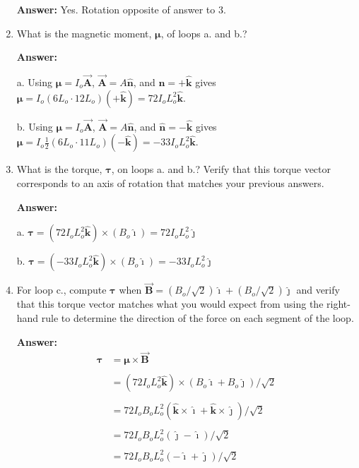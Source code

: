 \documentclass{article}
\newcommand{\ihat}[0]{\hat{\boldsymbol{\imath}}}
\newcommand{\jhat}[0]{\hat{\boldsymbol{\jmath}}}
\newcommand{\khat}[0]{\hat{\boldsymbol{k}}}
\newcommand{\bfvec}[1]{\vec{\mathbf{#1}}}
\begin{document}
\begin{enumerate}
        \ifsolutions
        {\bf Answer: } Yes. Rotation opposite of answer to 3.
        \else
        \vskip 56.25pt
        \fi
        \ifsolutions\else
        \vskip 56.25pt
        \fi

  \item What is the magnetic moment, $\boldsymbol{\mu}$, of loops a. and b.?

        \ifsolutions
        {\bf Answer:} 

        a. Using $\boldsymbol{\mu} = I_o\bfvec{A}$, $\bfvec{A} = A\hat{\mathbf{n}}$, and $\hat{\mathbf{n}} = +\khat$ gives $\boldsymbol{\mu } = I_o(6L_o\cdot 12 L_o)(+\khat) = 72I_oL_o^2\khat$.

        b.  Using $\boldsymbol{\mu} = I_o\bfvec{A}$, $\bfvec{A} = A\hat{\mathbf{n}}$, and $\hat{\mathbf{n}} = -\khat$ gives $\boldsymbol{\mu } = I_o\frac{1}{2}(6L_o\cdot 11 L_o)(-\khat) = -33I_oL_o^2\khat$.
        \else
        \vskip 56.25pt
        \fi
        \ifsolutions\else
        \vskip 56.25pt
        \fi

  \item What is the torque, $\boldsymbol{\tau}$, on loops a. and b.? Verify that this torque vector corresponds to an axis of rotation that matches your previous answers.

        \ifsolutions
        {\bf Answer: }

        a. $\boldsymbol{\tau}= (72I_oL_o^2\khat)\times (B_o\ihat)= 72I_oL_o^2\jhat$

        b. $\boldsymbol{\tau}= (-33I_oL_o^2\khat)\times (B_o\ihat)= -33I_oL_o^2\jhat$
        \else
        \vskip 56.25pt
        \fi
        \ifsolutions\else
        \vskip 56.25pt
        \fi

  \item For loop c., compute $\boldsymbol{\tau}$ when $\bfvec{B}=(B_o/\sqrt{2})\ihat + (B_o/\sqrt{2})\jhat$ and verify that this torque vector matches what you would expect from using the right-hand rule to determine the direction of the force on each segment of the loop.

        \ifsolutions
        {\bf Answer: }
        \begin{equation}
        \begin{align*}
        \boldsymbol{\tau} & = \boldsymbol{\mu}\times\bfvec{B} \\\\
        &  =(72I_oL_o^2\khat)\times (B_o\ihat+B_o\jhat)/\sqrt{2}\\\\
        & = 72I_oB_oL_o^2(\khat\times \ihat + \khat\times \jhat)/\sqrt{2}\\\\
        & = 72I_oB_oL_o^2(\jhat-\ihat)/\sqrt{2}\\\\
        & = 72I_oB_oL_o^2(-\ihat+\jhat)/\sqrt{2}
        \end{align*}
        \end{equation}


\end{enumerate}
\end{document}
